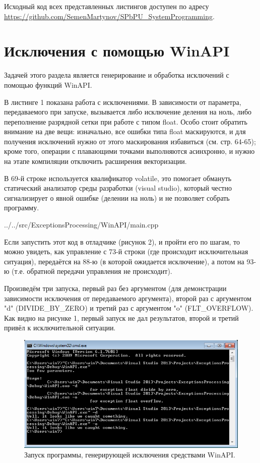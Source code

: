 \documentclass[a4paper, 12pt]{report}		%
\begin{document}
\vspace{1em}
Исходный код всех представленных листингов доступен по адресу \\ \url{https://github.com/SemenMartynov/SPbPU_SystemProgramming}.

\chapter*{Исключения с помощью WinAPI}

Задачей этого раздела является генерирование и обработка исключений с помощью функций WinAPI.

В листинге 1 показана работа с исключениями. В зависимости от параметра, передаваемого при запуске, вызывается либо исключение деления на ноль, либо переполнение разрядной сетки при работе с типом float. Особо стоит обратить внимание на две вещи: изначально, все ошибки типа float маскируются, и для получения исключений нужно от этого маскирования избавиться (см. стр. 64-65); кроме того, операции с плавающими точками выполняются асинхронно, и нужно на этапе компиляции отключить расширения векторизации.

В 69-й строке используется квалификатор volatile, это помогает обмануть статический анализатор среды разработки (visual studio), который честно сигнализирует о явной ошибке (делении на ноль) и не позволяет собрать программу.


{../../src/ExceptionsProcessing/WinAPI/main.cpp}


Если запустить этот код в отладчике (рисунок 2), и пройти его по шагам, то можно увидеть, как управление с 73-й строки (где происходит исключительная ситуация),  передаётся на 88-ю (в которой ожидается исключение), а потом на 93-ю (т.е. обратной передачи управления не происходит).

Произведём три запуска, первый раз без аргументом (для демонстрации зависимости исключения от передаваемого аргумента), второй раз с аргументом "\-d" (DIVIDE\_BY\_ZERO) и третий раз с аргументом "\-o" (FLT\_OVERFLOW). Как видно на рисунке 1, первый запуск не дал результатов, второй и третий привёл к исключительной ситуации.

\begin{figure}[h!]
\centering
\includegraphics[scale=0.95]{res/001}
\caption{Запуск программы, генерирующей исключения средствами WinAPI.}
\end{figure}
\end{document}
